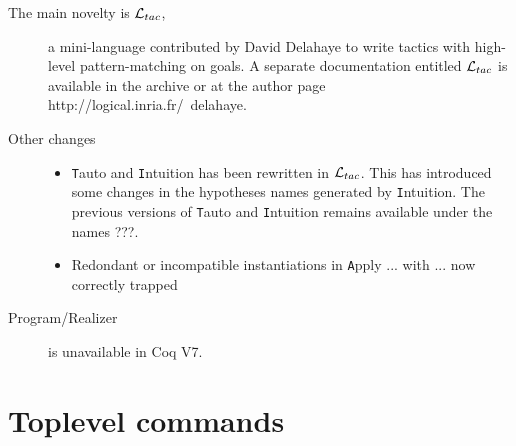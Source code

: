 \documentclass[11pt]{article}
\begin{document}
\begin{description}

\item[The main novelty is ${\cal L}_{tac}$,] a mini-language contributed
by David Delahaye to write tactics with high-level pattern-matching on
goals. A separate documentation entitled ${\cal L}_{tac}$ is available
in the archive or at the author page
http://logical.inria.fr/~delahaye.


\item[Other changes]

  \begin{itemize}

  \item {\texttt Tauto} and {\texttt Intuition} has been rewritten in
${\cal L}_{tac}$. This has introduced some changes in the hypotheses names
generated by {\texttt Intuition}. The previous versions of {\texttt
Tauto} and {\texttt Intuition} remains available under the names ???.\\

  \item	Redondant or incompatible instantiations in {\texttt
  Apply ... with ...} now correctly trapped

  \end{itemize}

  \item[Program/Realizer] is unavailable in Coq V7.

\end{description}

\section{Toplevel commands}
\end{document}
